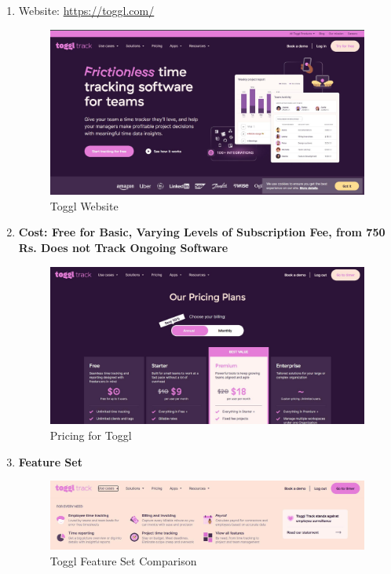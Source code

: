 \documentclass[openany]{report}
\begin{document}
\begin{enumerate}
    \item Website: \url{https://toggl.com/}\\
          \begin{figure}[H]
              \centering
              \includegraphics[width=.95\textwidth]{toggl.jpg}
              \caption{Toggl Website}
          \end{figure}

    \item \textbf{Cost: Free for Basic, Varying Levels of Subscription Fee, from 750 Rs. Does not Track Ongoing Software}\\

          \begin{figure}[H]
              \centering
              \includegraphics[width=.95\textwidth]{toggl pricing.jpg}
              \caption{Pricing for Toggl}
          \end{figure}
    \item \textbf{Feature Set}
          \begin{figure}[H]
              \centering
              \includegraphics[width=.95\textwidth]{toggl featureset.jpg}
              \caption{Toggl Feature Set Comparison}
          \end{figure}
\end{enumerate}
\end{document}
